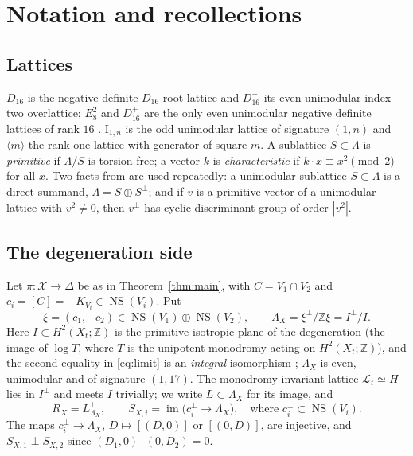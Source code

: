 \documentclass[12pt]{article}
\newcommand{\Z}{\mathbb Z}
\newcommand{\NS}{\operatorname{NS}}
\newcommand{\im}{\operatorname{im}}
\newcommand{\calX}{\mathcal X}
\newcommand{\calL}{\mathcal L}
\newcommand{\I}{\mathrm{I}}
\theoremstyle{definition}
\theoremstyle{remark}
\begin{document}
\section{Notation and recollections}\label{sec:recall}

\subsection{Lattices}

\(D_{16}\) is the negative definite \(D_{16}\) root lattice and
\(D_{16}^+\) its even unimodular index-two overlattice; \(E_8^2\) and
\(D_{16}^+\) are the only even unimodular negative definite lattices of
rank \(16\) \cite[\S8]{Se}. \(\I_{1,n}\) is the odd unimodular lattice
of signature \((1,n)\) and \(\langle m\rangle\) the rank-one lattice
with generator of square \(m\). A sublattice \(S\subset\Lambda\) is
\emph{primitive} if \(\Lambda/S\) is torsion free; a vector \(k\) is
\emph{characteristic} if \(k\cdot x\equiv x^2\pmod 2\) for all \(x\).
Two facts from \cite{Ni} are used repeatedly: a unimodular sublattice
\(S\subset\Lambda\) is a direct summand, \(\Lambda=S\oplus S^\perp\);
and if \(v\) is a primitive vector of a unimodular lattice with
\(v^2\neq0\), then \(v^\perp\) has cyclic discriminant group of order
\(|v^2|\).

\subsection{The degeneration side}\label{sec:degside}

Let \(\pi\colon\calX\to\Delta\) be as in Theorem~\ref{thm:main}, with
\(C=V_1\cap V_2\) and \(c_i=[C]=-K_{V_i}\in\NS(V_i)\). Put
\begin{equation}\label{eq:limit}
 \xi=(c_1,-c_2)\in\NS(V_1)\oplus\NS(V_2),\qquad
 \Lambda_X=\xi^\perp/\Z\xi=I^\perp/I .
\end{equation}
Here \(I\subset H^2(X_t;\Z)\) is the primitive isotropic plane of the
degeneration (the image of \(\log T\), where \(T\) is the unipotent
monodromy acting on \(H^2(X_t;\Z)\)), and the second equality in \eqref{eq:limit} is an
\emph{integral} isomorphism \cite[Proposition~3.5]{GT}; \(\Lambda_X\)
is even, unimodular and of signature \((1,17)\). The monodromy
invariant lattice \(\calL_t\simeq H\) lies in \(I^\perp\) and meets
\(I\) trivially; we write \(L\subset\Lambda_X\) for its image, and
\begin{equation}\label{eq:SX}
 R_X=L^\perp_{\Lambda_X},\qquad
 S_{X,i}=\im\bigl(c_i^\perp\longrightarrow\Lambda_X\bigr),
 \quad\text{where } c_i^\perp\subset\NS(V_i).
\end{equation}
The maps \(c_i^\perp\to\Lambda_X\), \(D\mapsto[(D,0)]\) or
\([(0,D)]\), are injective, and \(S_{X,1}\perp S_{X,2}\) since
\((D_1,0)\cdot(0,D_2)=0\).
\end{document}
